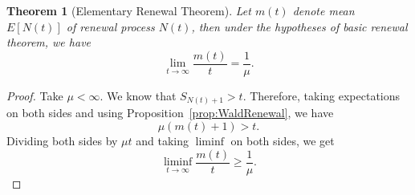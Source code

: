 \documentclass[a4paper,10pt]{article}
\theoremstyle{plain}
\newtheorem{thm}{Theorem}[section]
\theoremstyle{definition}
\begin{document}
\begin{thm}[Elementary Renewal Theorem] Let $m(t)$ denote mean $E[N(t)]$ of renewal process $N(t)$, then under the hypotheses of basic renewal theorem, we have 
\begin{equation*}
\lim_{t \to \infty}\frac{m(t)}{t} = \frac{1}{\mu}.
\end{equation*}
\end{thm}
\begin{proof}
Take $\mu < \infty$. We know that $S_{N(t)+1} > t$. Therefore, taking expectations on both sides and using Proposition~\ref{prop:WaldRenewal}, we have 
\begin{equation*}
\mu (m(t) + 1) > t.
\end{equation*}
Dividing both sides by $\mu t$ and taking $\liminf$ on both sides, we get
\begin{equation}
\label{eq:LiminfMean}
	\liminf_{t \to \infty} \frac{m(t)}{t} \geq \frac{1}{\mu}.
\end{equation}


\end{proof}
\end{document}
